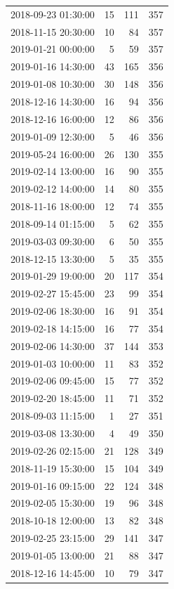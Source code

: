 \begin{tabular}{lrrr}
2018-09-23 01:30:00 & 15 & 111 & 357 \\
2018-11-15 20:30:00 & 10 & 84 & 357 \\
2019-01-21 00:00:00 & 5 & 59 & 357 \\
2019-01-16 14:30:00 & 43 & 165 & 356 \\
2019-01-08 10:30:00 & 30 & 148 & 356 \\
2018-12-16 14:30:00 & 16 & 94 & 356 \\
2018-12-16 16:00:00 & 12 & 86 & 356 \\
2019-01-09 12:30:00 & 5 & 46 & 356 \\
2019-05-24 16:00:00 & 26 & 130 & 355 \\
2019-02-14 13:00:00 & 16 & 90 & 355 \\
2019-02-12 14:00:00 & 14 & 80 & 355 \\
2018-11-16 18:00:00 & 12 & 74 & 355 \\
2018-09-14 01:15:00 & 5 & 62 & 355 \\
2019-03-03 09:30:00 & 6 & 50 & 355 \\
2018-12-15 13:30:00 & 5 & 35 & 355 \\
2019-01-29 19:00:00 & 20 & 117 & 354 \\
2019-02-27 15:45:00 & 23 & 99 & 354 \\
2019-02-06 18:30:00 & 16 & 91 & 354 \\
2019-02-18 14:15:00 & 16 & 77 & 354 \\
2019-02-06 14:30:00 & 37 & 144 & 353 \\
2019-01-03 10:00:00 & 11 & 83 & 352 \\
2019-02-06 09:45:00 & 15 & 77 & 352 \\
2019-02-20 18:45:00 & 11 & 71 & 352 \\
2018-09-03 11:15:00 & 1 & 27 & 351 \\
2019-03-08 13:30:00 & 4 & 49 & 350 \\
2019-02-26 02:15:00 & 21 & 128 & 349 \\
2018-11-19 15:30:00 & 15 & 104 & 349 \\
2019-01-16 09:15:00 & 22 & 124 & 348 \\
2019-02-05 15:30:00 & 19 & 96 & 348 \\
2018-10-18 12:00:00 & 13 & 82 & 348 \\
2019-02-25 23:15:00 & 29 & 141 & 347 \\
2019-01-05 13:00:00 & 21 & 88 & 347 \\
2018-12-16 14:45:00 & 10 & 79 & 347 \\

\end{tabular}
